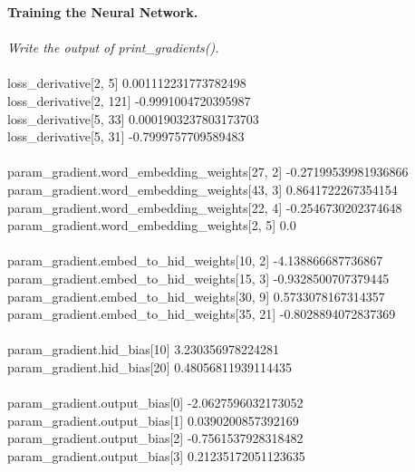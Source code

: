 \documentclass{myhw}
\begin{document}
\begin{homeworkProblem}
\textbf{Training the Neural Network.} \\
\\
\emph{Write the output of print\_gradients().} \\
\\
loss\_derivative[2, 5] 0.001112231773782498 \\
loss\_derivative[2, 121] -0.9991004720395987\\
loss\_derivative[5, 33] 0.0001903237803173703\\
loss\_derivative[5, 31] -0.7999757709589483\\
\\
param\_gradient.word\_embedding\_weights[27, 2] -0.27199539981936866\\
param\_gradient.word\_embedding\_weights[43, 3] 0.8641722267354154\\
param\_gradient.word\_embedding\_weights[22, 4] -0.2546730202374648\\
param\_gradient.word\_embedding\_weights[2, 5] 0.0\\
\\
param\_gradient.embed\_to\_hid\_weights[10, 2] -4.138866687736867\\
param\_gradient.embed\_to\_hid\_weights[15, 3] -0.9328500707379445\\
param\_gradient.embed\_to\_hid\_weights[30, 9] 0.5733078167314357\\
param\_gradient.embed\_to\_hid\_weights[35, 21] -0.8028894072837369\\
\\
param\_gradient.hid\_bias[10] 3.230356978224281\\
param\_gradient.hid\_bias[20] 0.48056811939114435\\
\\
param\_gradient.output\_bias[0] -2.0627596032173052\\
param\_gradient.output\_bias[1] 0.0390200857392169\\
param\_gradient.output\_bias[2] -0.7561537928318482\\
param\_gradient.output\_bias[3] 0.21235172051123635
\end{homeworkProblem}
\end{document}
